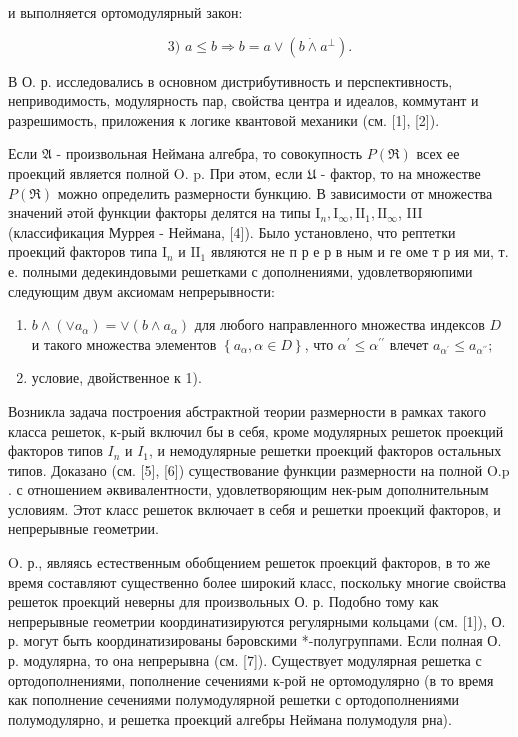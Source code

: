 \documentclass[10pt]{article}
\begin{document}
и выполняется ортомодулярный закон:

\[
\text { 3) } a \leqslant b \Rightarrow b=a \vee\left(b \dot{\wedge} a^{\perp}\right) \text {. }
\]

В О. р. исследовались в основном дистрибутивность и перспективность, неприводимость, модулярность пар, свойства центра и идеалов, коммутант и разрешимость, приложения к логике квантовой механики (см. [1], [2]).

Если $\mathfrak{A}$ - произвольная Неймана алгебра, то совокупность $P(\mathfrak{\Re})$ всех ее проекций является полной O. p. При әтом, если $\mathfrak{U}$ - фактор, то на множестве $P(\mathfrak{\Re})$ можно определить размерности бункцию. В зависимости от множества значений әтой функции факторы делятся на типы $\mathrm{I}_{n}, \mathrm{I}_{\infty}, \mathrm{II}_{1}, \mathrm{II}_{\infty}$, III (классификация Муррея - Неймана, [4]). Было установлено, что рептетки проекций факторов типа $\mathrm{I}_{n}$ и $\mathrm{II}_{1}$ являются не п р е р в ным и ге оме т р ия ми, т. е. полными дедекиндовыми решетками с дополнениями, удовлетворяюпими следующим двум аксиомам непрерывности:

\begin{enumerate}
  \item $b \wedge\left(\vee a_{\alpha}\right)=\vee\left(b \wedge a_{\alpha}\right)$ для любого направленного множества индексов $D$ и такого множества элементов $\left\{a_{\alpha}, \alpha \in D\right\}$, что $\alpha^{\prime} \leqslant \alpha^{\prime \prime}$ влечет $a_{\alpha^{\prime}} \leqslant a_{\alpha^{\prime \prime}} ;$

  \item условие, двойственное к 1).

\end{enumerate}

Возникла задача построения абстрактной теории размерности в рамках такого класса решеток, к-рый включил бы в себя, кроме модулярных решеток проекций факторов типов $I_{n}$ и $I_{1}$, и немодулярные решетки проекций факторов остальных типов. Доказано (см. [5], [6]) существование функции размерности на полной $\mathrm{O} . \mathrm{p}$. с отношением әквивалентности, удовлетворяющим нек-рым дополнительным условиям. Этот класс решеток включает в себя и решетки проекций факторов, и непрерывные геометрии.

O. р., являясь естественным обобщением решеток проекций факторов, в то же время составляют существенно более широкий класс, поскольку многие своӥства решеток проекций неверны для произвольных О. р. Подобно тому как непрерывные геометрии координатизируются регулярными кольцами (см. [1]), О. р. могут быть координатизированы бәровскими *-полугруппами. Если полная О. р. модулярна, то она непрерывна (см. [7]). Существует модулярная решетка с ортодополнениями, пополнение сечениями к-рой не ортомодулярно (в то время как пополнение сечениями полумодулярной решетки с ортодополнениями полумодулярно, и решетка проекций алгебры Неймана полумодуля рна).
\end{document}
